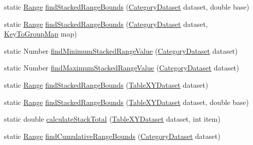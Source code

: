 \begin{DoxyCompactItemize}
\item 
static \mbox{\hyperlink{classorg_1_1jfree_1_1data_1_1_range}{Range}} \mbox{\hyperlink{classorg_1_1jfree_1_1data_1_1general_1_1_dataset_utilities_a2183f33e3f21871ef58484671a7bfd95}{find\+Stacked\+Range\+Bounds}} (\mbox{\hyperlink{interfaceorg_1_1jfree_1_1data_1_1category_1_1_category_dataset}{Category\+Dataset}} dataset, double base)
\item 
static \mbox{\hyperlink{classorg_1_1jfree_1_1data_1_1_range}{Range}} \mbox{\hyperlink{classorg_1_1jfree_1_1data_1_1general_1_1_dataset_utilities_af22cfd881cb9fd99baccc3f70c5c94cf}{find\+Stacked\+Range\+Bounds}} (\mbox{\hyperlink{interfaceorg_1_1jfree_1_1data_1_1category_1_1_category_dataset}{Category\+Dataset}} dataset, \mbox{\hyperlink{classorg_1_1jfree_1_1data_1_1_key_to_group_map}{Key\+To\+Group\+Map}} map)
\item 
static Number \mbox{\hyperlink{classorg_1_1jfree_1_1data_1_1general_1_1_dataset_utilities_af4c50f8d4c50ba9664952917fc2c308a}{find\+Minimum\+Stacked\+Range\+Value}} (\mbox{\hyperlink{interfaceorg_1_1jfree_1_1data_1_1category_1_1_category_dataset}{Category\+Dataset}} dataset)
\item 
static Number \mbox{\hyperlink{classorg_1_1jfree_1_1data_1_1general_1_1_dataset_utilities_a70a1d79ab34eb976726f3a647ea4565c}{find\+Maximum\+Stacked\+Range\+Value}} (\mbox{\hyperlink{interfaceorg_1_1jfree_1_1data_1_1category_1_1_category_dataset}{Category\+Dataset}} dataset)
\item 
static \mbox{\hyperlink{classorg_1_1jfree_1_1data_1_1_range}{Range}} \mbox{\hyperlink{classorg_1_1jfree_1_1data_1_1general_1_1_dataset_utilities_aad756864ae876364cbd7596ce0820ab6}{find\+Stacked\+Range\+Bounds}} (\mbox{\hyperlink{interfaceorg_1_1jfree_1_1data_1_1xy_1_1_table_x_y_dataset}{Table\+X\+Y\+Dataset}} dataset)
\item 
static \mbox{\hyperlink{classorg_1_1jfree_1_1data_1_1_range}{Range}} \mbox{\hyperlink{classorg_1_1jfree_1_1data_1_1general_1_1_dataset_utilities_a9c477a5cdb456f23af14ac27d052d44e}{find\+Stacked\+Range\+Bounds}} (\mbox{\hyperlink{interfaceorg_1_1jfree_1_1data_1_1xy_1_1_table_x_y_dataset}{Table\+X\+Y\+Dataset}} dataset, double base)
\item 
static double \mbox{\hyperlink{classorg_1_1jfree_1_1data_1_1general_1_1_dataset_utilities_a53924f12fe537800f273248de14dcab6}{calculate\+Stack\+Total}} (\mbox{\hyperlink{interfaceorg_1_1jfree_1_1data_1_1xy_1_1_table_x_y_dataset}{Table\+X\+Y\+Dataset}} dataset, int item)
\item 
static \mbox{\hyperlink{classorg_1_1jfree_1_1data_1_1_range}{Range}} \mbox{\hyperlink{classorg_1_1jfree_1_1data_1_1general_1_1_dataset_utilities_a3dc44edb9475e94543fbdfee43bda64c}{find\+Cumulative\+Range\+Bounds}} (\mbox{\hyperlink{interfaceorg_1_1jfree_1_1data_1_1category_1_1_category_dataset}{Category\+Dataset}} dataset)

\end{DoxyCompactItemize}
